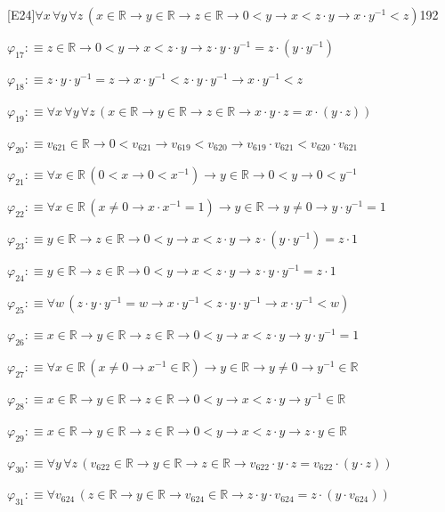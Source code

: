 \begin{fullproof}{[E24]}{$\forall x\,\forall y\,\forall z\,(x \in \mathbb{R} \to y \in \mathbb{R} \to z \in \mathbb{R} \to 0 < y \to x < z \cdot y \to x \cdot y^{-1} < z)$}{192}
\begin{abbrevlist}
\item $\varphi_{17} :\equiv z \in \mathbb{R} \to 0 < y \to x < z \cdot y \to z \cdot y \cdot y^{-1} = z \cdot (y \cdot y^{-1})$
\item $\varphi_{18} :\equiv z \cdot y \cdot y^{-1} = z \to x \cdot y^{-1} < z \cdot y \cdot y^{-1} \to x \cdot y^{-1} < z$
\item $\varphi_{19} :\equiv \forall x\,\forall y\,\forall z\,(x \in \mathbb{R} \to y \in \mathbb{R} \to z \in \mathbb{R} \to x \cdot y \cdot z = x \cdot (y \cdot z))$
\item $\varphi_{20} :\equiv v_{621} \in \mathbb{R} \to 0 < v_{621} \to v_{619} < v_{620} \to v_{619} \cdot v_{621} < v_{620} \cdot v_{621}$
\item $\varphi_{21} :\equiv \forall x \in \mathbb{R}\,(0 < x \to 0 < x^{-1}) \to y \in \mathbb{R} \to 0 < y \to 0 < y^{-1}$
\item $\varphi_{22} :\equiv \forall x \in \mathbb{R}\,(x \neq 0 \to x \cdot x^{-1} = 1) \to y \in \mathbb{R} \to y \neq 0 \to y \cdot y^{-1} = 1$
\item $\varphi_{23} :\equiv y \in \mathbb{R} \to z \in \mathbb{R} \to 0 < y \to x < z \cdot y \to z \cdot (y \cdot y^{-1}) = z \cdot 1$
\item $\varphi_{24} :\equiv y \in \mathbb{R} \to z \in \mathbb{R} \to 0 < y \to x < z \cdot y \to z \cdot y \cdot y^{-1} = z \cdot 1$
\item $\varphi_{25} :\equiv \forall w\,(z \cdot y \cdot y^{-1} = w \to x \cdot y^{-1} < z \cdot y \cdot y^{-1} \to x \cdot y^{-1} < w)$
\item $\varphi_{26} :\equiv x \in \mathbb{R} \to y \in \mathbb{R} \to z \in \mathbb{R} \to 0 < y \to x < z \cdot y \to y \cdot y^{-1} = 1$
\item $\varphi_{27} :\equiv \forall x \in \mathbb{R}\,(x \neq 0 \to x^{-1} \in \mathbb{R}) \to y \in \mathbb{R} \to y \neq 0 \to y^{-1} \in \mathbb{R}$
\item $\varphi_{28} :\equiv x \in \mathbb{R} \to y \in \mathbb{R} \to z \in \mathbb{R} \to 0 < y \to x < z \cdot y \to y^{-1} \in \mathbb{R}$
\item $\varphi_{29} :\equiv x \in \mathbb{R} \to y \in \mathbb{R} \to z \in \mathbb{R} \to 0 < y \to x < z \cdot y \to z \cdot y \in \mathbb{R}$
\item $\varphi_{30} :\equiv \forall y\,\forall z\,(v_{622} \in \mathbb{R} \to y \in \mathbb{R} \to z \in \mathbb{R} \to v_{622} \cdot y \cdot z = v_{622} \cdot (y \cdot z))$
\item $\varphi_{31} :\equiv \forall v_{624}\,(z \in \mathbb{R} \to y \in \mathbb{R} \to v_{624} \in \mathbb{R} \to z \cdot y \cdot v_{624} = z \cdot (y \cdot v_{624}))$

\end{abbrevlist}
\end{fullproof}
